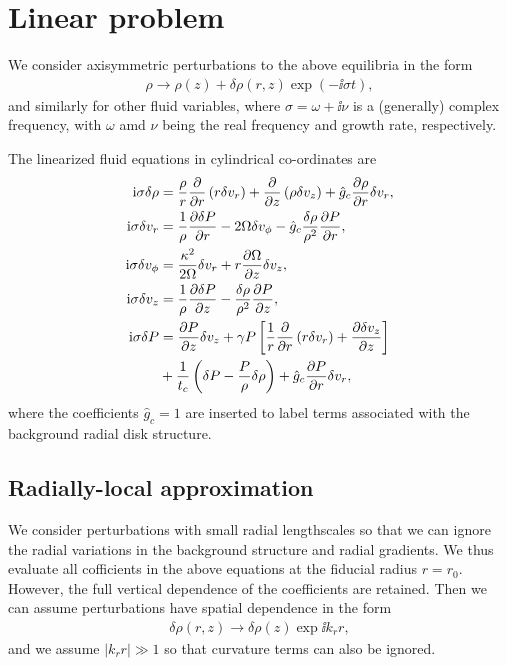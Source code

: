 \section{Linear problem}\label{linear}
We consider axisymmetric perturbations to the above equilibria in the
form 
\begin{align}
  \rho \to \rho(z) + \delta\rho(r,z)\exp{\left( - \ii\sigma
      t\right)},    
\end{align}
and similarly for other fluid variables, where $\sigma = \omega + \ii
\nu$ is a (generally) complex frequency, with $\omega$ amd $\nu$ being
the real frequency and growth rate, respectively.

The linearized fluid equations in cylindrical co-ordinates are  
\begin{align}
  \mathrm{i}\sigma\delta\rho &= \frac{\rho}{r}\frac{\partial}{\partial r}\left(r\delta v_r\right) + \frac{\partial}{\partial
    z}\left(\rho\delta v_z\right)  + \hat{g}_c\frac{\partial\rho}{\partial r}\delta v_r,\\
  \mathrm{i}\sigma\delta v_r &= \frac{1}{\rho}\frac{\partial\delta P}{\partial r} - 2\Omega
  \delta v_\phi - \hat{g}_c\frac{\delta\rho}{\rho^2}\frac{\partial P}{\partial r},\\ 
  \mathrm{i}\sigma\delta v_\phi  &= \frac{\kappa^2}{2\Omega}\delta v_r +
  r\frac{\partial\Omega}{\partial z}\delta v_z,\\
  \mathrm{i} \sigma\delta v_z &= \frac{1}{\rho}\frac{\partial\delta P}{\partial z} -
  \frac{\delta \rho}{\rho^2}\frac{\partial P}{\partial z},\\
  \mathrm{i}\sigma\delta P &=\frac{\partial P}{\partial z}\delta v_z + \gamma P
  \left[\frac{1}{r}\frac{\partial}{\partial r}\left(r\delta v_r\right) + \frac{\partial
      \delta v_z}{\partial z}\right]\notag \\
  &+ \frac{1}{t_c}\left(\delta P -  
    \frac{P}{\rho}\delta\rho\right) + \hat{g}_c \frac{\partial P}{\partial r}\delta v_r,\label{full_energy1}
\end{align}
where the coefficients $\hat{g}_c=1$ are inserted to label terms
associated with the background radial disk structure. 

\subsection{Radially-local approximation}  
We consider perturbations with small radial lengthscales 
so that we can ignore the radial variations in the background
structure and radial gradients. We thus evaluate all cofficients in
the above equations at the fiducial radius $r=r_0$. However, the full
vertical dependence of the coefficients are retained. Then we can
assume perturbations have spatial dependence in the form
\begin{align}
  \delta \rho(r,z) \to \delta\rho(z)\exp{\ii k_r r},
\end{align}
and we assume $|k_rr|\gg1$ so that curvature terms can also be
ignored.       

